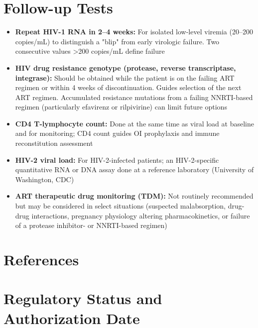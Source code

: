 \section*{Follow-up Tests}
\begin{itemize}
  \item \textbf{Repeat HIV-1 RNA in 2--4 weeks:} For isolated low-level viremia (20--200 copies/mL) to distinguish a "blip" from early virologic failure. Two consecutive values >200 copies/mL define failure
  \item \textbf{HIV drug resistance genotype (protease, reverse transcriptase, integrase):} Should be obtained while the patient is on the failing ART regimen or within 4 weeks of discontinuation. Guides selection of the next ART regimen. Accumulated resistance mutations from a failing NNRTI-based regimen (particularly efavirenz or rilpivirine) can limit future options
  \item \textbf{CD4 T-lymphocyte count:} Done at the same time as viral load at baseline and for monitoring; CD4 count guides OI prophylaxis and immune reconstitution assessment
  \item \textbf{HIV-2 viral load:} For HIV-2-infected patients; an HIV-2-specific quantitative RNA or DNA assay done at a reference laboratory (University of Washington, CDC)
  \item \textbf{ART therapeutic drug monitoring (TDM):} Not routinely recommended but may be considered in select situations (suspected malabsorption, drug-drug interactions, pregnancy physiology altering pharmacokinetics, or failure of a protease inhibitor- or NNRTI-based regimen)
\end{itemize}

\section*{References}



\clearpage
\section*{Regulatory Status and Authorization Date}

\clearpage
